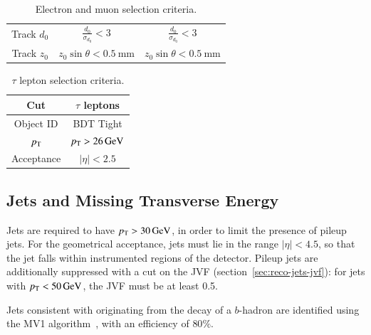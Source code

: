 \begin{table}[h]
\begin{tabular}{ccc}
		Track $d_0$ & $\frac{d_0}{\sigma_{d_0}}<3$  & $\frac{d_0}{\sigma_{d_0}}<3$  \\
		Track $z_0$ & $z_0\sin\theta<0.5~\mbox{mm}$ & $z_0\sin\theta<0.5~\mbox{mm}$  \\
	\end{tabular}
	\caption{Electron and muon selection criteria.}
	\label{table:electron-muon-selections}
\end{table}

\begin{table}[h]
	\centering
		\begin{tabular}{cc}
			Cut & $\tau$ leptons \\
			\hline
			Object ID & BDT Tight \\
			$p_{\text{T}}$ & $p_{\text{T}}>\SI{26}{\giga\electronvolt}$ \\
			Acceptance & $|\eta|<2.5$ \\
		\end{tabular}
	\caption{$\tau$ lepton selection criteria.}
	\label{table:tau-selections}
\end{table}

\subsection{Jets and Missing Transverse Energy}\label{sec:model-independent-jets-met}


Jets are required to have $p_{\text{T}}>\SI{30}{\giga\electronvolt}$, in order to limit the presence of pileup jets. For the geometrical acceptance, jets must lie in the range $|\eta|<4.5$, so that the jet falls within instrumented regions of the detector. Pileup jets are additionally suppressed with a cut on the JVF (section~\ref{sec:reco-jets-jvf}): for jets with $p_{\text{T}}<\SI{50}{\giga\electronvolt}$, the JVF must be at least 0.5. 

Jets consistent with originating from the decay of a $b$-hadron are identified using the MV1 algorithm~\cite{TheATLASCollaboration:2014vj}, with an efficiency of $80\%$. 

